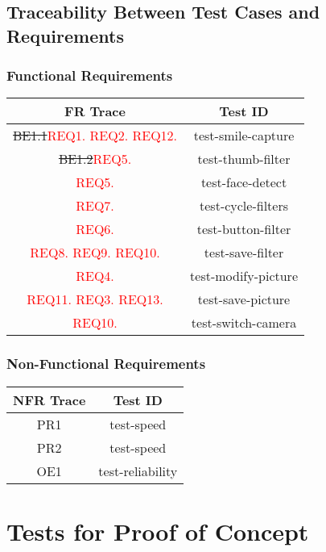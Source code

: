 \documentclass[12pt, titlepage]{article}
\begin{document}
\subsection{Traceability Between Test Cases and Requirements}

\subsubsection{Functional Requirements}

\begin{center}
\begin{tabular}{ |c|c| } 
 \hline
 FR Trace & Test ID \\ 
  \hline
   \hline
\sout{BE1.1}\textcolor{red}{REQ1. REQ2. REQ12.} & test-smile-capture \\ 
  \hline
\sout{BE1.2}\textcolor{red}{REQ5.} & test-thumb-filter \\ 
 \hline
 \textcolor{red}{REQ5.} & test-face-detect \\ 
 \hline
 \textcolor{red}{REQ7.} & test-cycle-filters \\ 
 \hline
 \textcolor{red}{REQ6.} & test-button-filter \\ 
 \hline
 \textcolor{red}{REQ8. REQ9. REQ10.} & test-save-filter \\ 
 \hline
 \textcolor{red}{REQ4.} & test-modify-picture \\ 
 \hline
 \textcolor{red}{REQ11. REQ3. REQ13.} & test-save-picture \\ 
 \hline
 \textcolor{red}{REQ10.} & test-switch-camera \\ 
 \hline
\end{tabular}
\end{center}

\subsubsection{Non-Functional Requirements}
\begin{center}
\begin{tabular}{ |c|c| } 
 \hline
 NFR Trace & Test ID \\ 
  \hline
   \hline
PR1 & test-speed \\ 
  \hline
PR2 & test-speed \\ 
  \hline
OE1 & test-reliability \\ 
 \hline
\end{tabular}
\end{center}
\section{Tests for Proof of Concept}
\end{document}
